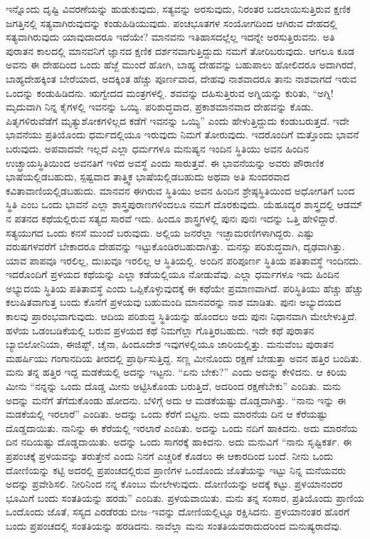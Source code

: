 ಇನ್ನೊಂದು ದೃಷ್ಟಿ ವಿವರಣೆಯನ್ನು ಹುಡುಕುವುದು, ಸತ್ಯವನ್ನು ಅರಸುವುದು, ನಿರಂತರ ಬದಲಾಯಿಸುತ್ತಿರುವ ಕ್ಷಣಿಕ ಜಗತ್ತಿನಲ್ಲಿ ಸತ್ಯವಾಗಿರುವುದನ್ನು ಕಂಡುಹಿಡಿಯುವುದು. ಪಂಚಭೂತಗಳ ಸಂಯೋಗದಿಂದ ಆಗಿರುವ ದೇಹದಲ್ಲಿ ಸತ್ಯವಾಗಿರುವುದು ಯಾವುದಾದರೂ ಇದೆಯೇ? ಮಾನವನು ಇತಿಹಾಸದಲ್ಲೆಲ್ಲ ಇದನ್ನೇ ಅರಸುತ್ತಿರುವನು. ಅತಿ ಪುರಾತನ ಕಾಲದಲ್ಲಿ ಮಾನವನಿಗೆ ಜ್ಞಾನದ ಕ್ಷಣಿಕ ದರ್ಶನವಾಗುತ್ತಿದ್ದುದು ನಮಗೆ ತೋರಿಬರುವುದು. ಆಗಲೂ ಕೂಡ ಅವನು ಈ ದೇಹದಿಂದ ಒಂದು ಹೆಜ್ಜೆ ಮುಂದೆ ಹೋಗಿ, ಬಾಹ್ಯ ದೇಹವನ್ನು ಬಹುಪಾಲು ಹೋಲಿದರೂ ಅದಾಗಿರದೆ, ಬಾಹ್ಯದೇಹಕ್ಕಿಂತ ಬೇರೆಯಾದ, ಅದಕ್ಕಿಂತ ಹೆಚ್ಚು ಪೂರ್ಣವಾದ, ದೇಹವು ನಾಶವಾದರೂ ತಾನು ನಾಶವಾಗದೆ ಇರುವ ಒಂದನ್ನು ಕಂಡುಹಿಡಿದನು. ಋಗ್ವೇದದ ಮಂತ್ರಗಳಲ್ಲಿ. ಶವವನ್ನು ದಹಿಸುತ್ತಿರುವ ಅಗ್ನಿಯನ್ನು ಕುರಿತು, “ಅಗ್ನಿ! ಮೃದುವಾಗಿ ನಿನ್ನ ಕೈಗಳಲ್ಲಿ ಇವನನ್ನು ಒಯ್ಯಿ. ಪರಿಶುದ್ಧವಾದ, ಪ್ರಕಾಶಮಾನವಾದ ದೇಹವನ್ನು ಕೊಡು. ಪಿತೃಗಳಿರುವೆಡೆಗೆ ಮೃತ್ಯುಶೋಕಗಳಿಲ್ಲದ ಕಡೆಗೆ ಇವನನ್ನು ಒಯ್ಯಿ” ಎಂದು ಹೇಳುತ್ತಿದ್ದುದು ಕಂಡುಬರುತ್ತದೆ. ಇದೇ ಭಾವನೆಯು ಪ್ರತಿಯೊಂದು ಧರ್ಮದಲ್ಲಿಯೂ ಇರುವುದು ನಿಮಗೆ ತೋರುವುದು. ಇದರೊಂದಿಗೆ ಮತ್ತೊಂದು ಭಾವನೆ ಬರುವುದು. ಅಪವಾದವೇ ಇಲ್ಲದೆ ಎಲ್ಲಾ ಧರ್ಮಗಳೂ ಮನುಷ್ಯನ ಇಂದಿನ ಸ್ಥಿತಿಯು ಅವನ ಹಿಂದಿನ ಉಚ್ಛ್ರಾಯಸ್ಥಿತಿಯಿಂದ ಅವನತಿಗೆ ಇಳಿದ ಅವಸ್ಥೆ ಎಂದು ಸಾರುತ್ತವೆ. ಈ ಭಾವನೆಯನ್ನು ಅವರು ಪೌರಾಣಿಕ ಭಾಷೆಯಲ್ಲಿಡಬಹುದು, ಸ್ಪಷ್ಟವಾದ ತಾತ್ತ್ವಿಕ ಭಾಷೆಯಲ್ಲಿಡಬಹುದು ಅಥವಾ ಅತಿ ಸುಂದರವಾದ ಕವಿತಾವಾಣಿಯಲ್ಲಿಡಬಹುದು. ಮಾನವನ ಈಗಿರುವ ಸ್ಥಿತಿಯು ಅವನ ಹಿಂದಿನ ಶ್ರೇಷ್ಠಸ್ಥಿತಿಯಿಂದ ಅಧೋಗತಿಗೆ ಬಂದ ಸ್ಥಿತಿ ಎಂಬ ಒಂದು ಭಾವನೆ ಎಲ್ಲಾ ಶಾಸ್ತ್ರಪುರಾಣಗಳಿಂದಲೂ ನಮಗೆ ದೊರಕುವುದು. ಯೆಹೂದ್ಯರ ಶಾಸ್ತ್ರದಲ್ಲಿ ಆಡಮ್​ನ ಪತನದ ಕಥೆಯಲ್ಲಿರುವ ಸತ್ಯದ ಸಾರವೆ ಇದು. ಹಿಂದೂ ಶಾಸ್ತ್ರಗಳಲ್ಲಿ ಪುನಃ ಪುನಃ ಇದನ್ನು ಒತ್ತಿ ಹೇಳಿದ್ದಾರೆ. ಸತ್ಯಯುಗದ ಒಂದು ಕನಸೆ ಮುಂದೆ ಬರುವುದು. ಅಲ್ಲಿಯ ಜನರೆಲ್ಲಾ ಇಚ್ಛಾಮರಣಿಗಳಾಗಿದ್ದರು. ಎಷ್ಟು ವರುಷಗಳವರೆಗೆ ಬೇಕಾದರೂ ದೇಹವನ್ನು ಇಟ್ಟುಕೊಂಡಿರಬಹುದಾಗಿತ್ತು. ಮನಸ್ಸು ಪರಿಶುದ್ಧವಾಗಿ, ದೃಢವಾಗಿತ್ತು. ಯಾವ ಪಾಪವೂ ಇರಲಿಲ್ಲ, ದುಃಖವೂ ಇರಲಿಲ್ಲ ಆ ಸ್ಥಿತಿಯಲ್ಲಿ. ಅಂದಿನ ಪರಿಪೂರ್ಣ ಸ್ಥಿತಿಯ ಪತಿತಾವಸ್ಥೆ ಇಂದಿನದು. ಇದರೊಂದಿಗೆ ಪ್ರಳಯದ ಕಥೆಯನ್ನು ಎಲ್ಲಾ ಕಡೆಯಲ್ಲಿಯೂ ನೋಡುವೆವು. ಎಲ್ಲಾ ಧರ್ಮಗಳೂ ಇದು ಹಿಂದಿನ ಅಭ್ಯುದಯ ಸ್ಥಿತಿಯ ಪತಿತಾವಸ್ಥೆ ಎಂದು ಒಪ್ಪಿಕೊಳ್ಳುವುದಕ್ಕೆ ಈ ಕಥೆಯೇ ಪ್ರಮಾಣವಾಗಿದೆ. ಪರಿಸ್ಥಿತಿಯು ಹೆಚ್ಚು ಹೆಚ್ಚು ಕಲುಷಿತವಾಗುತ್ತ ಬಂದು ಕೊನೆಗೆ ಪ್ರಳಯವು ಬಹುಮಂದಿ ಮಾನವರನ್ನು ನಾಶ ಮಾಡಿತು. ಪುನಃ ಅಭ್ಯುದಯದ ಕಾಲವು ಪ್ರಾರಂಭವಾಗುವುದು. ಆದಿಯ ಪರಿಶುದ್ಧ ಸ್ಥಿತಿಯನ್ನು ಹೊಂದಲು ಅದು ಪುನಃ ನಿಧಾನವಾಗಿ ಮೇಲೇಳುತ್ತಿದೆ. ಹಳೆಯ ಒಡಂಬಡಿಕೆಯಲ್ಲಿ ಬರುವ ಪ್ರಳಯದ ಕಥೆ ನಿಮಗೆಲ್ಲಾ ಗೊತ್ತಿರಬಹುದು. ಇದೇ ಕಥೆ ಪುರಾತನ ಬ್ಯಾಬಿಲೋನಿಯಾ, ಈಜಿಪ್ಟ್​, ಚೈನಾ, ಹಿಂದೂದೇಶ ಇವುಗಳಲ್ಲಿಯೂ ಜಾರಿಯಲ್ಲಿತ್ತು. ಮನುವೆಂಬ ಪುರಾತನ ಮಹರ್ಷಿಯು ಗಂಗಾನದಿಯ ತೀರದಲ್ಲಿ ಪ್ರಾರ್ಥಿಸುತ್ತಿದ್ದ. ಸಣ್ಣ ಮೀನೊಂದು ರಕ್ಷಣೆ ಬೇಡುತ್ತಾ ಅವನ ಹತ್ತಿರ ಬಂದಿತು. ಮನು ತನ್ನ ಹತ್ತಿರ ಇದ್ದ ಮಡಕೆಯಲ್ಲಿ ಅದನ್ನು ಇಟ್ಟನು. “ಏನು ಬೇಕು?” ಎಂದು ಅದನ್ನು ಕೇಳಿದನು. ಆ ಕಿರಿಯ ಮೀನು “ನನ್ನನ್ನು ಒಂದು ದೊಡ್ಡ ಮೀನು ಅಟ್ಟಿಸಿಕೊಂಡು ಬರುತ್ತಿದೆ, ಅದರಿಂದ ರಕ್ಷಣೆಬೇಕು” ಎಂದಿತು. ಮನು ಅದನ್ನು ಮನೆಗೆ ತೆಗೆದುಕೊಂಡು ಹೋದನು. ಬೆಳಿಗ್ಗೆ ಅದು ಆ ಮಡಕೆಯಷ್ಟು ದೊಡ್ಡದಾಗಿತ್ತು. “ನಾನು ಇನ್ನು ಈ ಮಡಕೆಯಲ್ಲಿ ಇರಲಾರೆ” ಎಂದಿತು. ಅದನ್ನು ಒಂದು ಕೆರೆಗೆ ಬಿಟ್ಟನು. ಅದು ಮಾರನೆಯ ದಿನ ಆ ಕೆರೆಯಷ್ಟು ದೊಡ್ಡದಾಯಿತು. ನಾನಿನ್ನು ಈ ಕೆರೆಯಲ್ಲಿ ಇರಲಾರೆ ಎಂದಿತು. ಅದನ್ನು ಒಂದು ನದಿಗೆ ಹಾಕಿದನು. ಅದು ಮಾರನೆಯ ದಿನ ನದಿಯಷ್ಟು ದೊಡ್ಡದಾಯಿತು. ಅದನ್ನು ಒಂದು ಸಾಗರಕ್ಕೆ ಹಾಕಿದನು. ಅದು ಮನುವಿಗೆ “ನಾನು ಸೃಷ್ಟಿಕರ್ತ. ಈ ಪ್ರಪಂಚಕ್ಕೆ ಪ್ರಳಯವನ್ನು ತರುತ್ತೇನೆ ಎಂದು ನಿನಗೆ ಎಚ್ಚರಿಕೆ ಕೊಡಲು ಈ ಆಕಾರದಿಂದ ಬಂದೆ. ನೀನು ಒಂದು ದೋಣಿಯನ್ನು ಕಟ್ಟಿ ಅದರಲ್ಲಿ ಪ್ರಪಂಚದಲ್ಲಿರುವ ಪ್ರಾಣಿಗಳ ಒಂದೊಂದು ಜೊತೆಯನ್ನು ಇಟ್ಟು ನಿನ್ನ ಮನೆಯವರು ಅದನ್ನು ಪ್ರವೇಶಿಸಲಿ. ನೀರಿನಿಂದ ನನ್ನ ಕೊಂಬು ಮೇಲೇಳುವುದು. ದೋಣಿಯನ್ನು ಅದಕ್ಕೆ ಕಟ್ಟು. ಪ್ರಳಯಾನಂದರ ಭೂಮಿಗೆ ಬಂದು ಸಂತತಿಯನ್ನು ಹರಡು” ಎಂದಿತು. ಪ್ರಳಯವಾಯಿತು. ಮನು ತನ್ನ ಸಂಸಾರ, ಪ್ರತಿಯೊಂದು ಪ್ರಾಣಿಯ ಒಂದೊಂದು ಜೊತೆ, ಸಸ್ಯದ ಎರಡೆರಡು ಬೀಜ–ಇವನ್ನು ದೋಣಿಯಲ್ಲಿಟ್ಟೂ ರಕ್ಷಿಸಿದನು. ಪ್ರಳಯಾನಂತರ ಹೊರಗೆ ಬಂದು ಪ್ರಪಂಚದಲ್ಲಿ ಸಂತತಿಯನ್ನು ಹರಡಿದನು. ನಾವೆಲ್ಲಾ ಮನು ಸಂತತಿಯವರಾದುದರಿಂದ ಮನುಷ್ಯರಾದೆವು.

